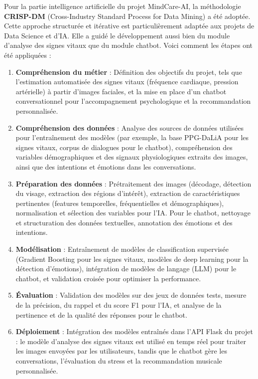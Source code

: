 Pour la partie intelligence artificielle du projet MindCare-AI, la méthodologie \textbf{CRISP-DM} (Cross-Industry Standard Process for Data Mining) a été adoptée. Cette approche structurée et itérative est particulièrement adaptée aux projets de Data Science et d’IA. Elle a guidé le développement aussi bien du module d’analyse des signes vitaux que du module chatbot. Voici comment les étapes ont été appliquées :

\begin{enumerate}
    \item \textbf{Compréhension du métier} : Définition des objectifs du projet, tels que l’estimation automatisée des signes vitaux (fréquence cardiaque, pression artérielle) à partir d’images faciales, et la mise en place d’un chatbot conversationnel pour l’accompagnement psychologique et la recommandation personnalisée.
    \item \textbf{Compréhension des données} : Analyse des sources de données utilisées pour l’entraînement des modèles (par exemple, la base PPG-DaLiA pour les signes vitaux, corpus de dialogues pour le chatbot), compréhension des variables démographiques et des signaux physiologiques extraits des images, ainsi que des intentions et émotions dans les conversations.
    \item \textbf{Préparation des données} : Prétraitement des images (décodage, détection du visage, extraction des régions d’intérêt), extraction de caractéristiques pertinentes (features temporelles, fréquentielles et démographiques), normalisation et sélection des variables pour l’IA. Pour le chatbot, nettoyage et structuration des données textuelles, annotation des émotions et des intentions.
    \item \textbf{Modélisation} : Entraînement de modèles de classification supervisée (Gradient Boosting pour les signes vitaux, modèles de deep learning pour la détection d’émotions), intégration de modèles de langage (LLM) pour le chatbot, et validation croisée pour optimiser la performance.
    \item \textbf{Évaluation} : Validation des modèles sur des jeux de données tests, mesure de la précision, du rappel et du score F1 pour l’IA, et analyse de la pertinence et de la qualité des réponses pour le chatbot.
    \item \textbf{Déploiement} : Intégration des modèles entraînés dans l’API Flask du projet : le modèle d’analyse des signes vitaux est utilisé en temps réel pour traiter les images envoyées par les utilisateurs, tandis que le chatbot gère les conversations, l’évaluation du stress et la recommandation musicale personnalisée.
\end{enumerate}


